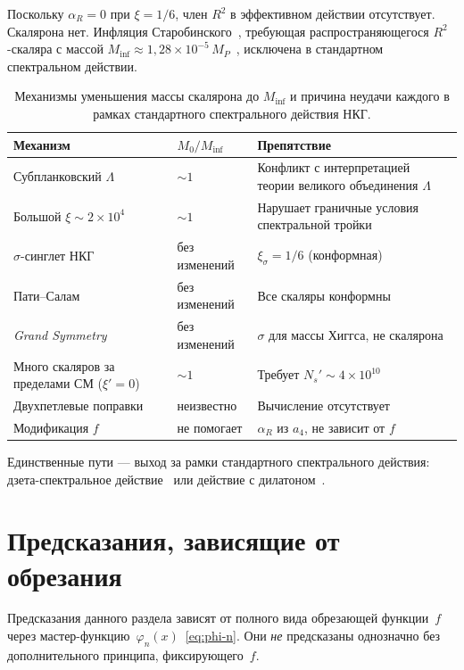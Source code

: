 \documentclass[12pt,a4paper]{article}
\theoremstyle{plain}
\theoremstyle{definition}
\theoremstyle{remark}
\begin{document}
Поскольку $\alpha_R = 0$ при $\xi = 1/6$, член $R^2$ в
эффективном действии отсутствует. Скалярона нет. Инфляция
Старобинского~\cite{Starobinsky:1980}, требующая распространяющегося
$R^2$-скаляра с массой $M_{\mathrm{inf}} \approx 1{,}28 \times
10^{-5}\, M_P$~\cite{Planck:2018}, исключена в стандартном
спектральном действии.

\begin{table}[ht]
\centering
\caption{Механизмы уменьшения массы скалярона до
$M_{\mathrm{inf}}$ и причина неудачи каждого в рамках стандартного
спектрального действия НКГ.}
\label{tab:inflation}
\begin{tabular}{p{3.5cm}p{2.5cm}p{5cm}}
\toprule
Механизм & $M_0/M_{\mathrm{inf}}$ & Препятствие \\
\midrule
Субпланковский $\Lambda$ & $\sim 1$ &
  Конфликт с интерпретацией теории великого объединения $\Lambda$ \\
Большой $\xi \sim 2 \times 10^4$ & $\sim 1$ &
  Нарушает граничные условия спектральной тройки \\
$\sigma$-синглет НКГ~\cite{BFS:2010} & без изменений &
  $\xi_\sigma = 1/6$ (конформная) \\
Пати--Салам~\cite{CCS:2013ps} & без изменений &
  Все скаляры конформны \\
\emph{Grand Symmetry}~\cite{CCS:2013gs} & без изменений &
  $\sigma$ для массы Хиггса, не скалярона \\
Много скаляров за пределами СМ ($\xi' = 0$) & $\sim 1$ &
  Требует $N_s' \sim 4 \times 10^{10}$ \\
Двухпетлевые поправки & неизвестно &
  Вычисление отсутствует \\
Модификация $f$ & не помогает &
  $\alpha_R$ из $a_4$, не зависит от $f$ \\
\bottomrule
\end{tabular}
\end{table}

Единственные пути --- выход за рамки стандартного спектрального
действия: дзета-спектральное действие~\cite{KLV:2015} или
действие с дилатоном~\cite{CC:2006dilaton}.

\section{Предсказания, зависящие от обрезания}
\label{sec:fragile}

Предсказания данного раздела зависят от полного вида обрезающей
функции~$f$ через мастер-функцию~$\varphi_n(x)$~\eqref{eq:phi-n}.
Они \emph{не} предсказаны однозначно без дополнительного принципа,
фиксирующего~$f$.
\end{document}
